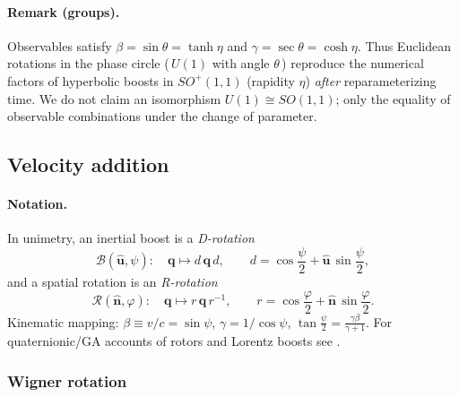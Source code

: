 \documentclass[11pt]{article}
\numberwithin{equation}{section}
\providecommand{\uhat}{\hat{\mathbf u}}
\begin{document}
\paragraph{Remark (groups).} Observables satisfy $\beta=\sin\theta=\tanh\eta$ and $\gamma=\sec\theta=\cosh\eta$. Thus Euclidean rotations in the phase circle (\,$U(1)$ with angle $\theta$\,) reproduce the numerical factors of hyperbolic boosts in $SO^+(1,1)$ (rapidity $\eta$) \emph{after} reparameterizing time. We do not claim an isomorphism $U(1)\cong SO(1,1)$; only the equality of observable combinations under the change of parameter.

\subsection{Velocity addition}
\label{sec:vel-addition}

\paragraph{Notation.}
In unimetry, an inertial boost is a \emph{D-rotation}
\begin{equation}
\label{eq:auto:32}
\mathcal{B}(\uhat,\psi):\quad \mathbf q \mapsto d\,\mathbf q\,d,
\qquad
d=\cos\frac{\psi}{2}+\uhat\,\sin\frac{\psi}{2},
\end{equation}
and a spatial rotation is an \emph{R-rotation}
\begin{equation}
\label{eq:auto:33}
\mathcal{R}(\hat{\mathbf n},\varphi):\quad \mathbf q \mapsto r\,\mathbf q\,r^{-1},
\qquad
r=\cos\frac{\varphi}{2}+\hat{\mathbf n}\,\sin\frac{\varphi}{2}.
\end{equation}
Kinematic mapping: $\beta\equiv v/c=\sin\psi$, $\gamma=1/\cos\psi$,
$\displaystyle \tan\frac{\psi}{2}=\frac{\gamma\beta}{\gamma+1}$.
For quaternionic/GA accounts of rotors and Lorentz boosts see \cite{Hamilton1844,HestenesSobczyk1984,DoranLasenby2003}.

\subsubsection{Wigner rotation}
\label{subsec:wigner}
\end{document}
